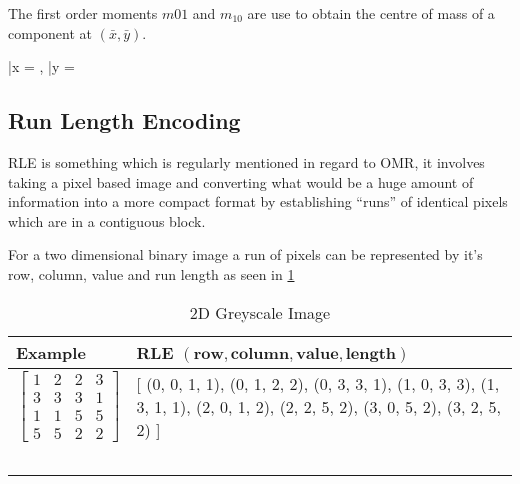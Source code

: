 The first order moments $m{01}$ and $m_{10}$ are use to obtain the centre of mass of a component at $(\bar{x}, \bar{y})$.

\begin{lequation}\label{eqn:1-moment-mass}
\bar{x} = , \bar{y} = 
\end{lequation}

\subsection{Run Length Encoding}
\label{sec:tb-rle}

\acrfull{RLE} is something which is regularly mentioned in regard to OMR, it involves taking a pixel based image and converting what would be a huge amount of information into a more compact format by establishing ``runs'' of identical pixels which are in a contiguous block.

For a two dimensional binary image a run of pixels can be represented by it's row, column, value and run length \parencite[p. 27-28]{burger2009principles} as seen in \cref{table:rle-2d}

\begin{table}[H]

    \begin{tabularx}{\textwidth}{ X | X }
        \toprule
        Example & RLE $(\textbf{row}, \textbf{column}, \textbf{value}, \textbf{length})$\\
        \midrule

        $$\begin{bmatrix}
        1 & 2 & 2 & 3  \\
        3 & 3 & 3 & 1  \\
        1 & 1 & 5 & 5  \\
        5 & 5 & 2 & 2
        \end{bmatrix}$$

        &
        {[} (0, 0, 1, 1), (0, 1, 2, 2), (0, 3, 3, 1), \newline
        (1, 0, 3, 3), (1, 3, 1, 1), (2, 0, 1, 2), \newline
        (2, 2, 5, 2), (3, 0, 5, 2), (3, 2, 5, 2) {]} \\
        \ & \ \\
    \bottomrule
    \end{tabularx}

    \caption{2D Greyscale Image}
    \label{table:rle-2d}
\end{table}


